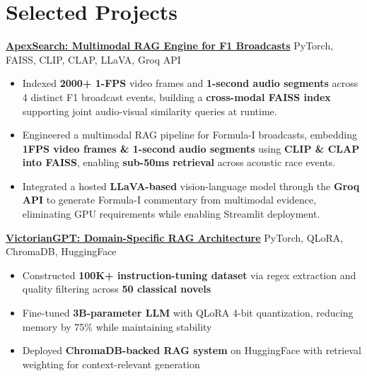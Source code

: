 \documentclass[10.5pt, a4paper]{article}
\newcommand{\resumeItem}[1]{\item[\textbullet] #1}
\newcommand{\projEntry}[2]{%
    \hspace*{-16pt}\textbf{#1} \hfill #2 \\[-4pt]
    \vspace{-8pt}
}
\begin{document}
\section{Selected Projects}
\projEntry
    {\href{https://github.com/hamza-faarooq/apexsearch}{ApexSearch: Multimodal RAG Engine for F1 Broadcasts}}{PyTorch, FAISS, CLIP, CLAP, LLaVA, Groq API}
        \vspace{-1pt}

\begin{itemize}[leftmargin=-1pt, itemsep=1pt, topsep=-2pt, parsep=0pt]
 \resumeItem{Indexed \textbf{2000+ 1-FPS} video frames and \textbf{1-second audio segments} across 4 distinct F1 broadcast events, building a \textbf{cross-modal FAISS index} supporting joint audio-visual similarity queries at runtime.}
\resumeItem{Engineered a multimodal RAG pipeline for Formula-I broadcasts, embedding \textbf{1FPS video frames \& 1-second audio segments} using \textbf{CLIP \& CLAP into FAISS}, enabling \textbf{sub-50ms retrieval} across acoustic race events.}
\resumeItem{Integrated a hosted \textbf{LLaVA-based} vision-language model through the \textbf{Groq API} to generate Formula-I commentary from multimodal evidence, eliminating GPU requirements while enabling Streamlit deployment.}
\end{itemize}
\vspace{3pt}

\projEntry
    {\href{https://github.com/hamza-faarooq/victoriangpt}{VictorianGPT: Domain-Specific RAG Architecture}}{PyTorch, QLoRA, ChromaDB, HuggingFace}
\begin{itemize}[leftmargin=-1pt, itemsep=1pt, topsep=-2pt, parsep=0pt]
    \resumeItem{Constructed \textbf{100K+ instruction-tuning dataset} via regex extraction and quality filtering across \textbf{50 classical novels}}
    \resumeItem{Fine-tuned \textbf{3B-parameter LLM} with QLoRA 4-bit quantization, reducing memory by 75\% while maintaining stability}
    \resumeItem{Deployed \textbf{ChromaDB-backed RAG system} on HuggingFace with retrieval weighting for context-relevant generation}
\end{itemize}
\vspace{3pt}
\end{document}

